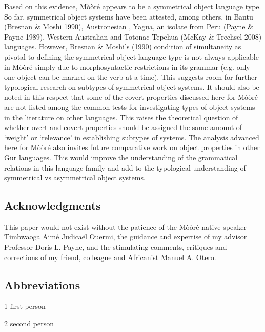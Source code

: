 \documentclass[output=paper]{langsci/langscibook}
\begin{document}
{{{{{{{Based on this evidence, M\`{o}\`{o}r\'{e} appears to be a symmetrical object language type. So far, symmetrical object systems have been attested, among others, in Bantu (Bresnan \& Moshi 1990), Austronesian \citep{Donohue1996}, Yagua, an isolate from Peru (Payne \& Payne 1989), Western Australian \citep{Dench1995} and Totonac-Tepehua (McKay \& Trechsel 2008) languages. However, Bresnan \& Moshi’s (1990)  condition of simultaneity as pivotal to defining the symmetrical object language type is not always applicable in M\`{o}\`{o}r\'{e} simply due to morphosyntactic restrictions in its grammar (e.g. only one object can be marked on the verb at a time). This suggests room for further typological research on subtypes of symmetrical object systems. It should also be noted in this respect that some of the covert properties discussed here for M\`{o}\`{o}r\'{e} are not listed among the common tests for investigating types of object systems in the literature on other languages. This raises the theoretical question of whether overt and covert properties should be assigned the same amount of ‘weight’ or ‘relevance’ in establishing subtypes of systems. The analysis advanced here for M\`{o}\`{o}r\'{e} also invites future comparative work on object properties in other Gur languages. This would improve the understanding of the grammatical relations in this language family and add to the typological understanding of symmetrical vs asymmetrical object systems.

\subsection{Acknowledgments}

This paper would not exist without the patience of the M\`{o}\`{o}r\'{e} native speaker Timbwaoga Aim\'{e} Judicaël Ouermi, the guidance and expertise of my advisor Professor Doris L. Payne, and the stimulating comments, critiques and corrections of my friend, colleague and Africanist Manuel A. Otero. 

\subsection{Abbreviations}
\begin{styleTabellenInhalt}
1  first person
\end{styleTabellenInhalt}

\begin{styleTabellenInhalt}
2  second person
\end{styleTabellenInhalt}

}}}}}}}
\end{document}
